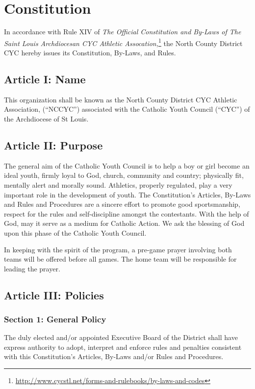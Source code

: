 \chapter{Constitution}
\label{chap:const}
In accordance with Rule XIV of {\em The Official Constitution and By-Laws of The Saint Louis Archdiocesan CYC Athletic Assocation,}\footnote{\url{http://www.cycstl.net/forms-and-rulebooks/by-laws-and-codes}} the North County District CYC hereby issues its Constitution, By-Laws, and Rules.

\section{Article I: Name}
\label{sec:const-1}
This organization shall be known as the North County District CYC Athletic Association, (“NCCYC”) associated with the Catholic Youth Council (``CYC'') of the Archdiocese of St Louis.

\section{Article II: Purpose}
\label{sec:const-2}
The general aim of the Catholic Youth Council is to help a boy or girl become an ideal youth, firmly loyal to God, church, community and country; physically fit, mentally alert and morally sound.  Athletics, properly regulated, play a very important role in the development of youth.  The Constitution’s Articles, By-Laws and Rules and Procedures are a sincere effort to promote good sportsmanship, respect for the rules and self-discipline amongst the contestants.  With the help of God, may it serve as a medium for Catholic Action.  We ask the blessing of God upon this phase of the Catholic Youth Council.

In keeping with the spirit of the program, a pre-game prayer involving both teams will be offered before all games. The home team will be responsible for leading the prayer.

\section{Article III: Policies}
\label{sec:const-3}
\subsection{Section 1: General Policy}
\label{ssec:const-3-1}
The duly elected and/or appointed Executive Board of the District shall have express authority to adopt, interpret and enforce rules and penalties consistent with this Constitution’s Articles, By-Laws and/or Rules and Procedures.

